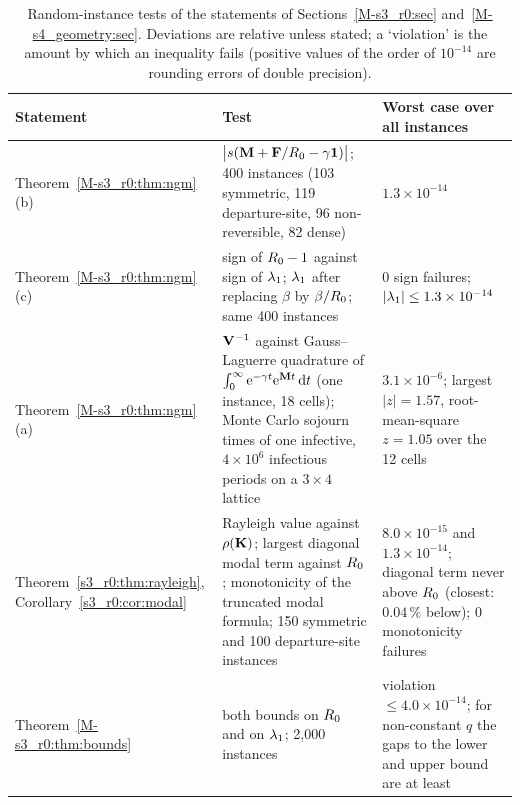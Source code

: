 \begin{table}[tbp]
\centering
\caption{Random-instance tests of the statements of Sections~\ref{M-s3_r0:sec} and~\ref{M-s4_geometry:sec}.
Deviations are relative unless stated; a `violation' is the amount by which an inequality fails
(positive values of the order of $10^{-14}$ are rounding errors of double precision).}
\label{appA_numerics:tab:theorems}
\footnotesize
\begin{tabular}{@{}>{\raggedright\arraybackslash}p{2.9cm}p{6.0cm}p{6.2cm}@{}}
\toprule
Statement & Test & Worst case over all instances\\
\midrule
Theorem~\ref{M-s3_r0:thm:ngm}(b) &
 $\bigl|s(\mathbf{M}+\mathbf{F}/R_0-\gamma\mathbf{1})\bigr|$; 400 instances (103 symmetric, 119 departure-site, 96
 non-reversible, 82 dense) & $1.3\times10^{-14}$\\
\addlinespace[3pt]
Theorem~\ref{M-s3_r0:thm:ngm}(c) &
 sign of $R_0-1$ against sign of $\lambda_1$; $\lambda_1$ after replacing $\beta$ by $\beta/R_0$; same 400
 instances & 0 sign failures; $|\lambda_1|\le1.3\times10^{-14}$\\
\addlinespace[3pt]
Theorem~\ref{M-s3_r0:thm:ngm}(a) &
 $\mathbf{V}^{-1}$ against Gauss--Laguerre quadrature of $\int_0^\infty\mathrm{e}^{-\gamma t}\mathrm{e}^{\mathbf{M} t}\,\mathrm{d} t$ (one
 instance, 18 cells); Monte Carlo sojourn times of one infective, $4\times10^{6}$ infectious periods on a
 $3\times4$ lattice & $3.1\times10^{-6}$; largest $|z|=1.57$, root-mean-square $z=1.05$ over the 12 cells\\
\addlinespace[3pt]
Theorem~\ref{s3_r0:thm:rayleigh}, Corollary~\ref{s3_r0:cor:modal} &
 Rayleigh value against $\rho(\mathbf{K})$; largest diagonal modal term against $R_0$; monotonicity of the
 truncated modal formula; 150 symmetric and 100 departure-site instances &
 $8.0\times10^{-15}$ and $1.3\times10^{-14}$; diagonal term never above $R_0$ (closest: $0.04\,\%$ below);
 0 monotonicity failures\\
\addlinespace[3pt]
Theorem~\ref{M-s3_r0:thm:bounds} &
 both bounds on $R_0$ and on $\lambda_1$; 2{,}000 instances &
 violation $\le4.0\times10^{-14}$; for non-constant $q$ the gaps to the lower and upper bound are at least

\end{tabular}
\end{table}
